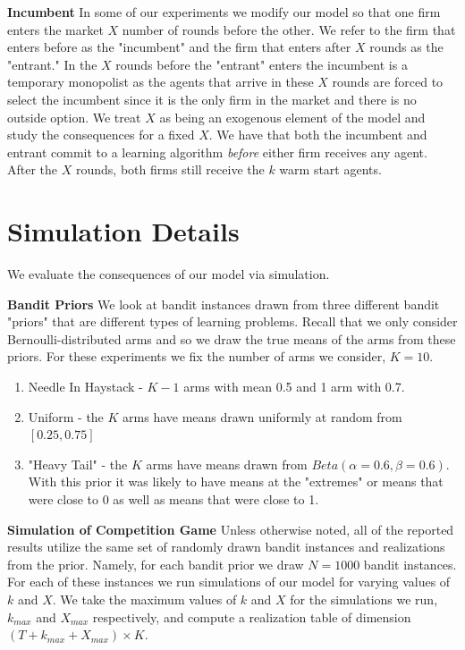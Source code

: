 \documentclass{article}
\theoremstyle{definition}
\begin{document}
\noindent \textbf{Incumbent} In some of our experiments we modify our model so that one firm enters the market $X$ number of rounds before the other. We refer to the firm that enters before as the "incumbent" and the firm that enters after $X$ rounds as the "entrant." In the $X$ rounds before the "entrant" enters the incumbent is a temporary monopolist as the agents that arrive in these $X$ rounds are forced to select the incumbent since it is the only firm in the market and there is no outside option. We treat $X$ as being an exogenous element of the model and study the consequences for a fixed $X$. We have that both the incumbent and entrant commit to a learning algorithm \textit{before} either firm receives any agent. After the $X$ rounds, both firms still receive the $k$ warm start agents.

\section{Simulation Details}\label{section:3}

We evaluate the consequences of our model via simulation.

\textbf{Bandit Priors} We look at bandit instances drawn from three different bandit "priors" that are different types of learning problems. Recall that we only consider Bernoulli-distributed arms and so we draw the true means of the arms from these priors. For these experiments we fix the number of arms we consider, $K = 10$.
\begin{enumerate}
\item Needle In Haystack - $K-1$ arms with mean 0.5 and 1 arm with 0.7.
\item Uniform - the $K$ arms have means drawn uniformly at random from $[0.25, 0.75]$
\item "Heavy Tail" - the $K$ arms have means drawn from $Beta(\alpha=0.6, \beta = 0.6)$. With this prior it was likely to have means at the "extremes" or means that were close to 0 as well as means that were close to 1.
\end{enumerate}

\noindent \textbf{Simulation of Competition Game} Unless otherwise noted, all of the reported results utilize the same set of randomly drawn bandit instances and realizations from the prior. Namely, for each bandit prior we draw $N = 1000$ bandit instances. For each of these instances we run simulations of our model for varying values of $k$ and $X$. We take the maximum values of $k$ and $X$ for the simulations we run, $k_{max}$ and $X_{max}$ respectively, and compute a realization table of dimension $(T+k_{max}+X_{max}) \times K$.
\end{document}
